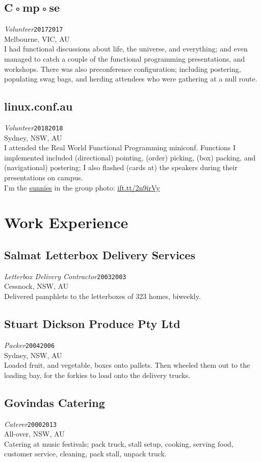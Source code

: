 \documentclass[12pt,a4paper,oneside]{article}
\newcommand{\xp}[6]{{\normalsize\textit{#1}\hfill\texttt{#5}\\\phantom{menace}\hfill#2, #3, #4}\\}
\newcommand{\textapprox}{\raisebox{0.5ex}{\texttildelow}}
\begin{document}
\subsection{C◦mp◦se}
\xp{Volunteer}{Melbourne}{VIC}{AU}{2017\textapprox{}2017}
\\I had functional discussions about life, the universe, and everything; and even managed to catch a couple of the functional programming presentations, and workshops. There was also preconference configuration; including postering, populating swag bags, and herding attendees who were gathering at a null route.
\subsection{linux.conf.au}
\xp{Volunteer}{Sydney}{NSW}{AU}{2018\textapprox{}2018}
\\I attended the Real World Functional Programming miniconf. Functions I implemented included (directional) pointing, (order) picking, (box) packing, and (navigational) postering; I also flashed (cards at) the speakers during their presentations on campus.
\\I'm the \href{https://www.flickr.com/photos/superroach/24972750417/}{sunnies} in the group photo: \href{https://twitter.com/developerjack/status/956790324126511104}{ift.tt/2n9irVy}

\section{Work Experience}
\subsection{Salmat Letterbox Delivery Services}
\xp{Letterbox Delivery Contractor}{Cessnock}{NSW}{AU}{2003\textapprox{}2003}
\\Delivered pamphlets to the letterboxes of 323 homes, biweekly.
\subsection{Stuart Dickson Produce Pty Ltd}
\xp{Packer}{Sydney}{NSW}{AU}{2004\textapprox{}2006}
\\Loaded fruit, and vegetable, boxes onto pallets. Then wheeled them out to the loading bay, for the forkies to load onto the delivery trucks.
\subsection{Govindas Catering}
\xp{Caterer}{All-over}{NSW}{AU}{2000\textapprox{}2013}
\\Catering at music festivals; pack truck, stall setup, cooking, serving food, customer service, cleaning, pack stall, unpack truck.
\end{document}
